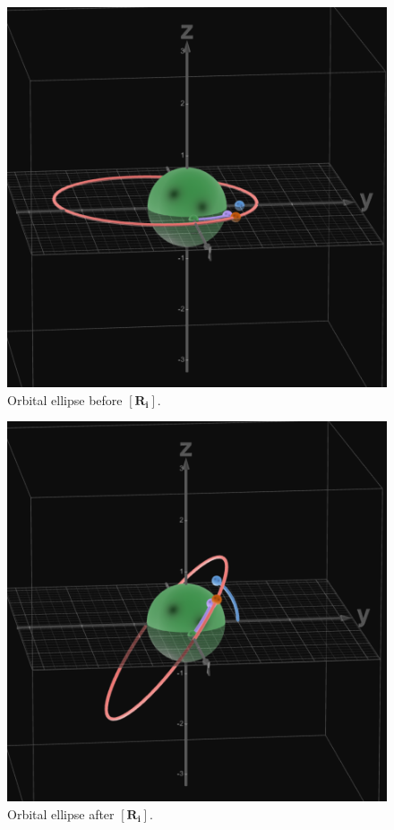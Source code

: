 \documentclass[conference]{IEEEtran}
\begin{document}
			\begin{figure}[hbtp]
				\begin{center}
					\includegraphics[width=0.8\columnwidth]{3.png}
				\end{center}
				\caption{Orbital ellipse before \( \bm{\left[R_i\right]} \).}
				\label{figL}
			\end{figure}

			\begin{figure}[hbtp]
				\begin{center}
					\includegraphics[width=0.8\columnwidth]{4.png}
				\end{center}
				\caption{Orbital ellipse after \( \bm{\left[R_i\right]} \).}
				\label{figM}
			\end{figure}
\end{document}
